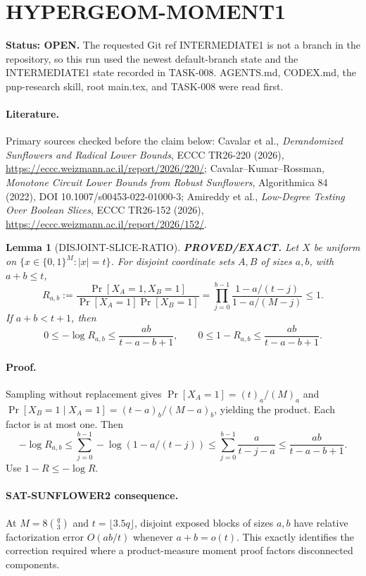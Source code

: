 \documentclass{article}
\newtheorem{lemma}{Lemma}
\begin{document}
\section*{HYPERGEOM-MOMENT1}
\textbf{Status: OPEN.} The requested Git ref INTERMEDIATE1 is not a branch in the repository, so this run used the newest default-branch state and the INTERMEDIATE1 state recorded in TASK-008. AGENTS.md, CODEX.md, the pnp-research skill, root main.tex, and TASK-008 were read first.

\paragraph{Literature.}
Primary sources checked before the claim below: Cavalar et al., \emph{Derandomized Sunflowers and Radical Lower Bounds}, ECCC TR26-220 (2026), \url{https://eccc.weizmann.ac.il/report/2026/220/}; Cavalar--Kumar--Rossman, \emph{Monotone Circuit Lower Bounds from Robust Sunflowers}, Algorithmica 84 (2022), DOI 10.1007/s00453-022-01000-3; Amireddy et al., \emph{Low-Degree Testing Over Boolean Slices}, ECCC TR26-152 (2026), \url{https://eccc.weizmann.ac.il/report/2026/152/}.

\begin{lemma}[DISJOINT-SLICE-RATIO]
\textbf{PROVED/EXACT.}
Let $X$ be uniform on $\{x\in\{0,1\}^M:|x|=t\}$. For disjoint coordinate sets $A,B$ of sizes $a,b$, with $a+b\le t$,
\[
R_{a,b}:=\frac{\Pr[X_A=1,X_B=1]}{\Pr[X_A=1]\Pr[X_B=1]}
=\prod_{j=0}^{b-1}\frac{1-a/(t-j)}{1-a/(M-j)}\le1.
\]
If $a+b<t+1$, then
\[
0\le-\log R_{a,b}\le\frac{ab}{t-a-b+1},
\qquad
0\le1-R_{a,b}\le\frac{ab}{t-a-b+1}.
\]
\end{lemma}
\paragraph{Proof.}
Sampling without replacement gives
$\Pr[X_A=1]=(t)_a/(M)_a$ and
$\Pr[X_B=1\mid X_A=1]=(t-a)_b/(M-a)_b$, yielding the product. Each factor is at most one. Then
\[
-\log R_{a,b}\le\sum_{j=0}^{b-1}-\log(1-a/(t-j))
\le\sum_{j=0}^{b-1}\frac{a}{t-j-a}
\le\frac{ab}{t-a-b+1}.
\]
Use $1-R\le-\log R$.

\paragraph{SAT-SUNFLOWER2 consequence.}
At $M=8\binom q3$ and $t=\lfloor3.5q\rfloor$, disjoint exposed blocks of sizes $a,b$ have relative factorization error $O(ab/t)$ whenever $a+b=o(t)$. This exactly identifies the correction required where a product-measure moment proof factors disconnected components.
\end{document}
